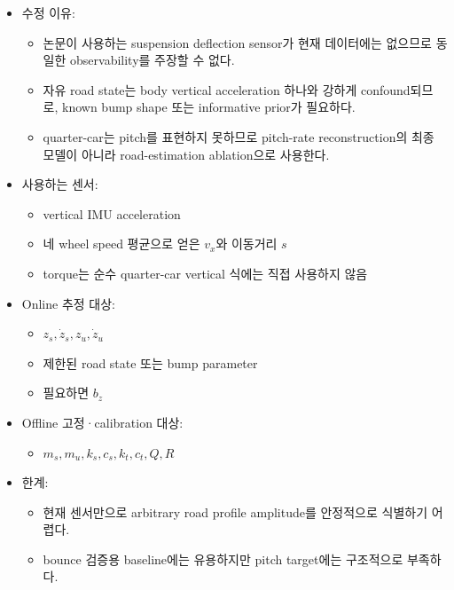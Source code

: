 \documentclass[letterpaper,10pt,journal,twocolumn]{ieeeconf}
\begin{document}
\begin{itemize}

\item
  수정 이유:

  \begin{itemize}
  
  \item
    논문이 사용하는 suspension deflection sensor가 현재 데이터에는 없으므로 동일한 observability를 주장할 수 없다.
  \item
    자유 road state는 body vertical acceleration 하나와 강하게 confound되므로, known bump shape 또는 informative prior가 필요하다.
  \item
    quarter-car는 pitch를 표현하지 못하므로 pitch-rate reconstruction의 최종 모델이 아니라 road-estimation ablation으로 사용한다.
  \end{itemize}
\item
  사용하는 센서:

  \begin{itemize}
  
  \item
    vertical IMU acceleration
  \item
    네 wheel speed 평균으로 얻은 \(v_x\)와 이동거리 \(s\)
  \item
    torque는 순수 quarter-car vertical 식에는 직접 사용하지 않음
  \end{itemize}
\item
  Online 추정 대상:

  \begin{itemize}
  
  \item
    \(z_s,\dot z_s,z_u,\dot z_u\)
  \item
    제한된 road state 또는 bump parameter
  \item
    필요하면 \(b_z\)
  \end{itemize}
\item
  Offline 고정·calibration 대상:

  \begin{itemize}
  
  \item
    \(m_s,m_u,k_s,c_s,k_t,c_t,Q,R\)
  \end{itemize}
\item
  한계:

  \begin{itemize}
  
  \item
    현재 센서만으로 arbitrary road profile amplitude를 안정적으로 식별하기 어렵다.
  \item
    bounce 검증용 baseline에는 유용하지만 pitch target에는 구조적으로 부족하다.
  \end{itemize}
\end{itemize}
\end{document}
